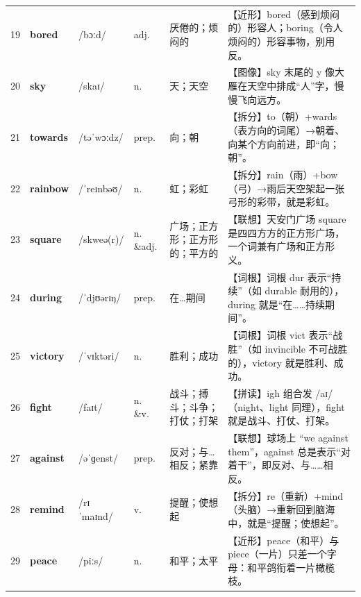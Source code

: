 \documentclass[UTF8,a4paper,11pt,oneside]{ctexbook}
\newcommand{\cellword}[1]{{\bfseries\textcolor{wordcol}{#1}}}
\newcommand{\cellipa}[1]{{\footnotesize\textcolor{ipacol}{#1}}}
\newcommand{\cellpos}[1]{\textcolor{poscol}{#1}}
\newcommand{\cellno}[1]{\textcolor{volcolor!75!black}{#1}}
\begin{document}
{\begin{longtable}{@{}C{0.045\textwidth}L{0.155\textwidth}L{0.175\textwidth}C{0.070\textwidth}L{0.180\textwidth}L{0.282\textwidth}@{}}
 \cellno{19} & \cellword{bored} & \cellipa{/bɔːd/} & \cellpos{adj.} & 厌倦的；烦闷的 & \textcolor{tagNear}{【近形】}bored（感到烦闷的）形容人；boring（令人烦闷的）形容事物，别用反。 \\
\cellno{20} & \cellword{sky} & \cellipa{/skaɪ/} & \cellpos{n.} & 天；天空 & \textcolor{tagImage}{【图像】}sky 末尾的 y 像大雁在天空中排成“人”字，慢慢飞向远方。 \\
 \cellno{21} & \cellword{towards} & \cellipa{/təˈwɔːdz/} & \cellpos{prep.} & 向；朝 & \textcolor{tagSplit}{【拆分】}to（朝）+wards（表方向的词尾）→\allowbreak{}朝着、向某个方向前进，即“向；朝”。 \\
\cellno{22} & \cellword{rainbow} & \cellipa{/ˈreɪnbəʊ/} & \cellpos{n.} & 虹；彩虹 & \textcolor{tagSplit}{【拆分】}rain（雨）+bow（弓）→\allowbreak{}雨后天空架起一张弓形的彩带，就是彩虹。 \\
 \cellno{23} & \cellword{square} & \cellipa{/skweə(r)/} & \cellpos{n. \&adj.} & 广场；正方形；正方形的；平方的 & \textcolor{tagAssoc}{【联想】}天安门广场 square 是四四方方的正方形广场，一个词兼有广场和正方形义。 \\
\cellno{24} & \cellword{during} & \cellipa{/ˈdjʊərɪŋ/} & \cellpos{prep.} & 在…期间 & \textcolor{tagRoot}{【词根】}词根 dur 表示“持续”（如 durable 耐用的），during 就是“在……持续期间”。 \\
 \cellno{25} & \cellword{victory} & \cellipa{/ˈvɪktəri/} & \cellpos{n.} & 胜利；成功 & \textcolor{tagRoot}{【词根】}词根 vict 表示“战胜”（如 invincible 不可战胜的），victory 就是胜利、成功。 \\
\cellno{26} & \cellword{fight} & \cellipa{/faɪt/} & \cellpos{n. \&v.} & 战斗；搏斗；斗争；打仗；打架 & \textcolor{tagSpell}{【拼读】}igh 组合发 /aɪ/（night、light 同理），fight 就是战斗、打仗、打架。 \\
 \cellno{27} & \cellword{against} & \cellipa{/əˈɡenst/} & \cellpos{prep.} & 反对；与…相反；紧靠 & \textcolor{tagAssoc}{【联想】}球场上 “we against them”，against 总是表示“对着干”，即反对、与……相反。 \\
\cellno{28} & \cellword{remind} & \cellipa{/rɪˈmaɪnd/} & \cellpos{v.} & 提醒；使想起 & \textcolor{tagSplit}{【拆分】}re（重新）+mind（头脑）→\allowbreak{}重新回到脑海中，就是“提醒；使想起”。 \\
 \cellno{29} & \cellword{peace} & \cellipa{/piːs/} & \cellpos{n.} & 和平；太平 & \textcolor{tagNear}{【近形】}peace（和平）与 piece（一片）只差一个字母：和平鸽衔着一片橄榄枝。 \\

\end{longtable}}
\end{document}

